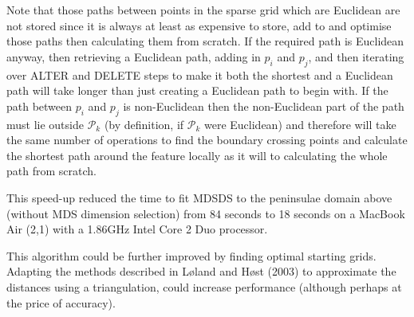 \documentclass[useAMS, referee]{biom}
\begin{document}
Note that those paths between points in the sparse grid which are Euclidean are not stored since it is always at least as expensive to store, add to and optimise those paths then calculating them from scratch. If the required path is Euclidean anyway, then retrieving a Euclidean path, adding in $p_i$ and $p_j$, and then iterating over ALTER and DELETE steps to make it both the shortest and a Euclidean path will take longer than just creating a Euclidean path to begin with. If the path between $p_i$ and $p_j$ is non-Euclidean then the non-Euclidean part of the path must lie outside $\mathcal{P}_k$ (by definition, if $\mathcal{P}_k$ were Euclidean) and therefore will take the same number of operations to find the boundary crossing points and calculate the shortest path around the feature locally as it will to calculating the whole path from scratch.

This speed-up reduced the time to fit MDSDS to the peninsulae domain above (without MDS dimension selection) from 84 seconds to 18 seconds on a MacBook Air (2,1) with a 1.86GHz Intel Core 2 Duo processor.

This algorithm could be further improved by finding optimal starting grids. Adapting the methods described in L{\o}land and H{\o}st (2003) to approximate the distances using a triangulation, could increase performance (although perhaps at the price of accuracy).
\end{document}
